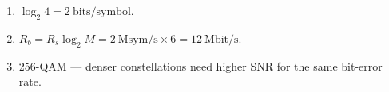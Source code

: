 \begin{enumerate}[leftmargin=1.6em,itemsep=2pt]
\item $\log_2 4 = 2\ \text{bits/symbol}$.
\item $R_b = R_s\log_2 M = 2\ \text{Msym/s}\times6 = 12\ \text{Mbit/s}$.
\item 256-QAM --- denser constellations need higher SNR for the same bit-error rate.
\end{enumerate}
